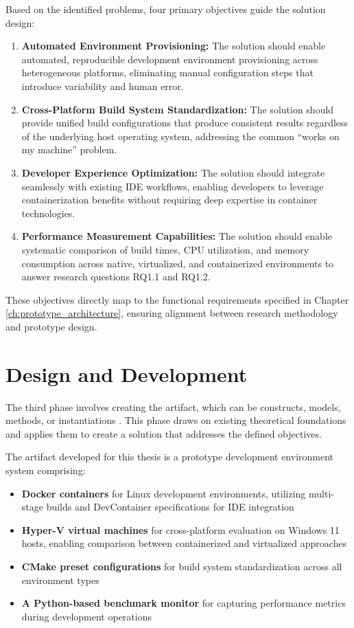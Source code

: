Based on the identified problems, four primary objectives guide the solution design:

\begin{enumerate}
	\item \textbf{Automated Environment Provisioning:} The solution should enable automated, reproducible development environment provisioning across heterogeneous platforms, eliminating manual configuration steps that introduce variability and human error.
	\item \textbf{Cross-Platform Build System Standardization:} The solution should provide unified build configurations that produce consistent results regardless of the underlying host operating system, addressing the common ``works on my machine'' problem.
	\item \textbf{Developer Experience Optimization:} The solution should integrate seamlessly with existing IDE workflows, enabling developers to leverage containerization benefits without requiring deep expertise in container technologies.
	\item \textbf{Performance Measurement Capabilities:} The solution should enable systematic comparison of build times, CPU utilization, and memory consumption across native, virtualized, and containerized environments to answer research questions RQ1.1 and RQ1.2.
\end{enumerate}

These objectives directly map to the functional requirements specified in Chapter \ref{ch:prototype_architecture}, ensuring alignment between research methodology and prototype design.

\section{Design and Development}

The third phase involves creating the artifact, which can be constructs, models, methods, or instantiations \citep{peffersDesignScienceResearch2007}.
This phase draws on existing theoretical foundations and applies them to create a solution that addresses the defined objectives.

The artifact developed for this thesis is a prototype development environment system comprising:

\begin{itemize}
	\item \textbf{Docker containers} for Linux development environments, utilizing multi-stage builds and DevContainer specifications for IDE integration
	\item \textbf{Hyper-V virtual machines} for cross-platform evaluation on Windows 11 hosts, enabling comparison between containerized and virtualized approaches
	\item \textbf{CMake preset configurations} for build system standardization across all environment types
	\item \textbf{A Python-based benchmark monitor} for capturing performance metrics during development operations
\end{itemize}

